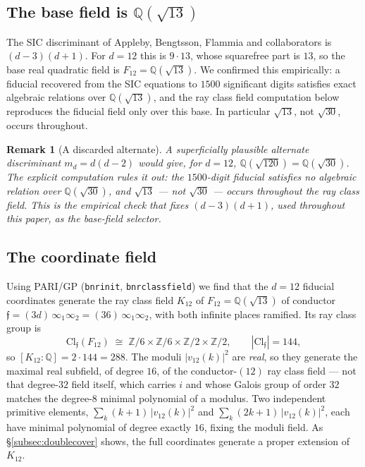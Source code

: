 \documentclass[12pt,a4paper]{article}
\newtheorem{remark}[theorem]{Remark}
\begin{document}
\subsection{The base field is \texorpdfstring{$\mathbb{Q}(\sqrt{13})$}{Q(sqrt13)}}

The SIC discriminant of Appleby, Bengtsson, Flammia and collaborators
\cite{Appleby2013,Appleby2017} is $(d-3)(d+1)$.  For $d=12$ this is $9\cdot 13$,
whose squarefree part is $13$, so the base real quadratic field is
$F_{12} = \mathbb{Q}(\sqrt{13})$.  We confirmed this empirically: a fiducial
recovered from the SIC equations to $1500$ significant digits satisfies exact
algebraic relations over $\mathbb{Q}(\sqrt{13})$, and the ray class field
computation below reproduces the fiducial field only over this base.  In
particular $\sqrt{13}$, not $\sqrt{30}$, occurs throughout.

\begin{remark}[A discarded alternate]
A superficially plausible alternate discriminant $m_d = d(d-2)$ would give, for
$d=12$, $\mathbb{Q}(\sqrt{120}) = \mathbb{Q}(\sqrt{30})$.  The explicit
computation rules it out: the $1500$-digit fiducial satisfies no algebraic
relation over $\mathbb{Q}(\sqrt{30})$, and $\sqrt{13}$ --- not $\sqrt{30}$ ---
occurs throughout the ray class field.  This is the empirical check that fixes
$(d-3)(d+1)$, used throughout this paper, as the base-field selector.
\end{remark}

\subsection{The coordinate field}

Using PARI/GP (\texttt{bnrinit}, \texttt{bnrclassfield}) we find that the $d=12$
fiducial coordinates generate the ray class field $K_{12}$ of
$F_{12} = \mathbb{Q}(\sqrt{13})$ of conductor
$\mathfrak{f} = (3d)\,\infty_1\infty_2 = (36)\,\infty_1\infty_2$, with both
infinite places ramified.  Its ray class group is
\[
\mathrm{Cl}_{\mathfrak{f}}(F_{12}) \;\cong\;
\mathbb{Z}/6 \times \mathbb{Z}/6 \times \mathbb{Z}/2 \times \mathbb{Z}/2,
\qquad |\mathrm{Cl}_{\mathfrak{f}}| = 144,
\]
so $[K_{12} : \mathbb{Q}] = 2\cdot 144 = 288$.  The moduli $|v_{12}(k)|^2$ are
\emph{real}, so they generate the maximal real subfield, of degree $16$, of the
conductor-$(12)$ ray class field --- not that degree-$32$ field itself, which carries
$i$ and whose Galois group of order $32$ matches the degree-$8$ minimal polynomial of a
modulus.  Two independent primitive elements, $\sum_k (k{+}1)\,|v_{12}(k)|^2$ and
$\sum_k (2k{+}1)\,|v_{12}(k)|^2$, each have minimal polynomial of degree exactly $16$,
fixing the moduli field.  As \S\ref{subsec:doublecover} shows, the full coordinates
generate a proper extension of $K_{12}$.
\end{document}
